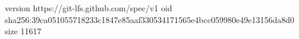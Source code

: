 version https://git-lfs.github.com/spec/v1
oid sha256:39ca051055718233c1847e85aaf330534171565e4bcc059980e49e13156da8d0
size 11617
